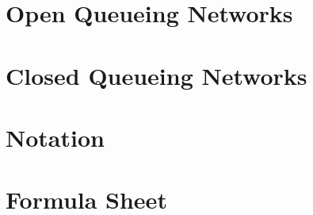 \chapter{Open Queueing Networks}
\label{sec:notes-relat-chapt2}




%


\chapter{Closed Queueing Networks}
\label{ch3}



%

%




\chapter*{Notation}
\label{sec:notation}


\chapter*{Formula Sheet}


\cleardoublepage
{}
{}
\printindex
